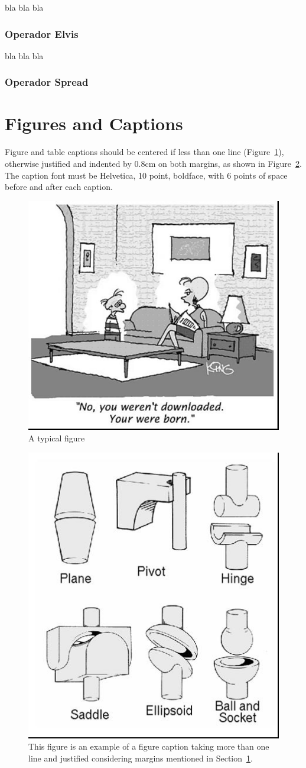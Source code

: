 \documentclass[12pt]{article}
\begin{document}
    bla bla bla

\subsubsection{Operador Elvis}

    bla bla bla

\subsubsection{Operador Spread}



\section{Figures and Captions}\label{sec:figs}

Figure and table captions should be centered if less than one line
(Figure~\ref{fig:exampleFig1}), otherwise justified and indented by 0.8cm on
both margins, as shown in Figure~\ref{fig:exampleFig2}. The caption font must
be Helvetica, 10 point, boldface, with 6 points of space before and after each
caption.

\begin{figure}[ht]
\centering
\includegraphics[width=.5\textwidth]{fig1.jpg}
\caption{A typical figure}
\label{fig:exampleFig1}
\end{figure}

\begin{figure}[ht]
\centering
\includegraphics[width=.3\textwidth]{fig2.jpg}
\caption{This figure is an example of a figure caption taking more than one
  line and justified considering margins mentioned in Section~\ref{sec:figs}.}
\label{fig:exampleFig2}
\end{figure}
\end{document}
